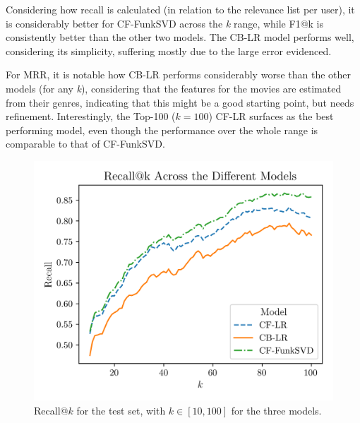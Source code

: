 \documentclass[conference]{IEEEtran}
\begin{document}
Considering how recall is calculated (in relation to the relevance list per user), it is considerably better for CF-FunkSVD across the \textit{k} range, while F1@k is consistently better than the other two models. The CB-LR model performs well, considering its simplicity, suffering mostly due to the large error evidenced. 

For MRR, it is notable how CB-LR performs considerably worse than the other models (for any \textit{k}), considering that the features for the movies are estimated from their genres, indicating that this might be a good starting point, but needs refinement. Interestingly, the Top-100 ($k=100$) CF-LR surfaces as the best performing model, even though the performance over the whole range is comparable to that of CF-FunkSVD.

\begin{figure}[H]
    \centering
    \includegraphics[width=1\linewidth]{assets/results_recallK.png}
    \caption{Recall@$k$ for the test set, with $k \in [10,100]$ for the three models.}
    \label{fig:results_recallK}
\end{figure}
\end{document}
